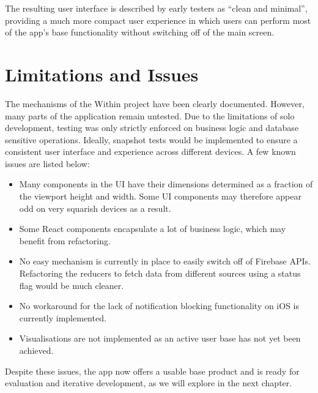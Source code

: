 The resulting user interface is described by early testers as ``clean and minimal'', providing a much more compact user experience in which users can perform most of the app's base functionality without switching off of the main screen.

\section{Limitations and Issues}
The mechanisms of the Within project have been clearly documented. However, many parts of the application remain untested. Due to the limitations of solo development, testing was only strictly enforced on business logic and database sensitive operations. Ideally, snapshot tests would be implemented to ensure a consistent user interface and experience across different devices. A few known issues are listed below:

\begin{itemize}
    \item Many components in the UI have their dimensions determined as a fraction of the viewport height and width. Some UI components may therefore appear odd on very squarish devices as a result.
    \item Some React components encapsulate a lot of business logic, which may benefit from refactoring.
    \item No easy mechanism is currently in place to easily switch off of Firebase APIs. Refactoring the reducers to fetch data from different sources using a status flag would be much cleaner.
    \item No workaround for the lack of notification blocking functionality on iOS is currently implemented.
    \item Visualisations are not implemented as an active user base has not yet been achieved.
\end{itemize}

Despite these issues, the app now offers a usable base product and is ready for evaluation and iterative development, as we will explore in the next chapter.